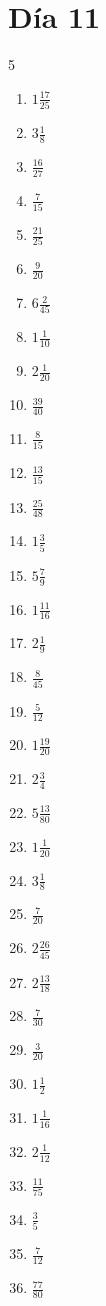 \documentclass[12pt]{article}
\begin{document}
\section*{Día 11}
\begin{multicols}{5}\begin{enumerate}
\item $ 1 \frac{17}{25} $
\item $ 3 \frac{1}{8} $
\item $ \frac{16}{27} $
\item $ \frac{7}{15} $
\item $ \frac{21}{25} $
\item $ \frac{9}{20} $
\item $ 6 \frac{2}{45} $
\item $ 1 \frac{1}{10} $
\item $ 2 \frac{1}{20} $
\item $ \frac{39}{40} $
\item $ \frac{8}{15} $
\item $ \frac{13}{15} $
\item $ \frac{25}{48} $
\item $ 1 \frac{3}{5} $
\item $ 5 \frac{7}{9} $
\item $ 1 \frac{11}{16} $
\item $ 2 \frac{1}{9} $
\item $ \frac{8}{45} $
\item $ \frac{5}{12} $
\item $ 1 \frac{19}{20} $
\item $ 2 \frac{3}{4} $
\item $ 5 \frac{13}{80} $
\item $ 1 \frac{1}{20} $
\item $ 3 \frac{1}{8} $
\item $ \frac{7}{20} $
\item $ 2 \frac{26}{45} $
\item $ 2 \frac{13}{18} $
\item $ \frac{7}{30} $
\item $ \frac{3}{20} $
\item $ 1 \frac{1}{2} $
\item $ 1 \frac{1}{16} $
\item $ 2 \frac{1}{12} $
\item $ \frac{11}{75} $
\item $ \frac{3}{5} $
\item $ \frac{7}{12} $
\item $ \frac{77}{80} $

\end{enumerate}
\end{multicols}
\end{document}
